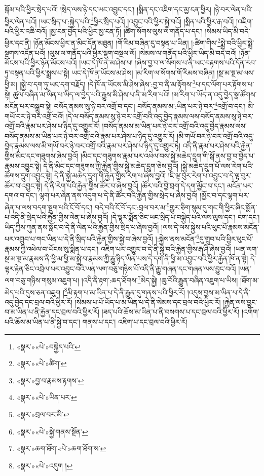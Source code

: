 སྐོམ་པའི་ཕྱིར་སྲེད་པའོ། །སྲེད་ལས་ཉེ་དང་ཡང་འབྱུང་དང་། །སྨིན་དང་འཇིག་དང་མྱ་ངན་ཕྱིར། །ཉེ་བར་ལེན་པའི་ཕྱིར་ལེན་པའོ། །ཡང་སྲིད་པ་:སྐྱེད་པའི་\footnote{«སྣར་»«པེ་»བསྐྱེད་པའི་}ཕྱིར་སྲིད་པའོ། །འབྱུང་བའི་ཕྱིར་སྐྱེ་བའོ། །སྨིན་པའི་ཕྱིར་རྒ་བའོ། །འཇིག་པའི་ཕྱིར་འཆི་བའོ། །མྱ་ངན་བྱེད་པའི་ཕྱིར་མྱ་ངན་ཏོ། །ཚིག་སོགས་ལུས་ལ་གནོད་པ་དང་། །སེམས་ཡིད་མི་བདེ་ཕྱིར་དང་ནི། །ཉོན་མོངས་ཕྱིར་ན་མིང་དོན་མཐུན། །གོ་རིམ་བཞིན་དུ་བསྟན་པ་ཡིན། །:ཚིག་གིས་\footnote{«སྣར་»«པེ་»ཚིག་}སྨྲེ་བའི་ཕྱིར་སྨྲེ་སྔགས་འདོན་པའོ། །ལུས་ལ་གནོད་པའི་ཕྱིར་སྡུག་བསྔལ་ལོ། །སེམས་ལ་གནོད་པའི་ཕྱིར་ཡིད་མི་བདེ་བའོ། །ཉོན་མོངས་པའི་ཕྱིར་ཉོན་མོངས་པའོ། །ཡང་དེ་ཁོ་ན་མ་ཤེས་པ། །ཞེས་བྱ་བ་ལ་སོགས་པ་ནི་ཡང་བརྟགས་པའི་དོན་རབ་ཏུ་བསྟན་པའི་ཕྱིར་སྨྲས་པ་སྟེ། ཡང་དེ་ཁོ་ན་ཡོངས་མ་ཤེས། །མ་རིག་ལ་སོགས་གོ་རིམས་བཞིན། །སྔ་མ་སྔ་མ་ལས་ཕྱི་མ། །སྐྱེ་བ་དག་ཏུ་ཡང་དག་བརྗོད། །དེ་ཁོ་ན་ཡོངས་མི་ཤེས་ཞེས་:བྱ་བ་ནི་མ་རྟོགས་\footnote{«སྣར་»བྱ་བ་རྣམས་རྟགས་}པ་དང་ལོག་པར་རྟོགས་པ་སྟེ། ཚུལ་བཞིན་མ་ཡིན་པ་ཡིད་ལ་བྱེད་པའི་རྒྱུས་མི་ཤེས་པ་ནི་མ་རིག་པའོ། །མ་རིག་པ་ཡོད་ན་འདུ་བྱེད་སྣ་ཚོགས་མངོན་པར་བསྒྲུབ་སྟེ། བསོད་ནམས་སུ་ཉེ་བར་འགྲོ་བ་དང་། བསོད་ནམས་མ་:ཡིན་པར་ཉེ་བར་\footnote{«སྣར་»«པེ་»ཡིན་པར་}འགྲོ་བ་དང་། མི་གཡོ་བར་ཉེ་བར་འགྲོ་བའོ། །དེ་ལ་བསོད་ནམས་སུ་ཉེ་བར་འགྲོ་བའི་འདུ་བྱེད་རྣམས་ལས་བསོད་ནམས་སུ་ཉེ་བར་འགྲོ་བའི་རྣམ་པར་ཤེས་པ་ཉིད་དུ་འགྱུར་རོ། །བསོད་ནམས་མ་ཡིན་པར་ཉེ་བར་འགྲོ་བའི་འདུ་བྱེད་རྣམས་ལས་བསོད་ནམས་མ་ཡིན་པར་ཉེ་བར་འགྲོ་བའི་རྣམ་པར་ཤེས་པ་ཉིད་དུ་འགྱུར་རོ། །མི་གཡོ་བར་ཉེ་བར་འགྲོ་བའི་འདུ་བྱེད་རྣམས་ལས་མི་གཡོ་བར་ཉེ་བར་འགྲོ་བའི་རྣམ་པར་ཤེས་པ་ཉིད་དུ་འགྱུར་ཏེ། འདི་ནི་རྣམ་པར་ཤེས་པའི་རྐྱེན་གྱིས་མིང་དང་གཟུགས་ཞེས་བྱའོ། །མིང་དང་གཟུགས་རྣམ་པར་འཕེལ་བས་སྐྱེ་མཆེད་དྲུག་གི་སྒོ་ནས་བྱ་བ་བྱེད་པ་རྣམས་འབྱུང་སྟེ། དེ་ནི་མིང་དང་གཟུགས་ཀྱི་རྐྱེན་གྱིས་སྐྱེ་མཆེད་དྲུག་ཅེས་བྱའོ། །སྐྱེ་མཆེད་དྲུག་པོ་ལས་རེག་པའི་ཚོགས་དྲུག་འབྱུང་སྟེ། དེ་ནི་སྐྱེ་མཆེད་དྲུག་གི་རྐྱེན་གྱིས་རེག་པ་ཞེས་བྱའོ། །ཇི་ལྟ་བུར་རེག་པ་འབྱུང་བ་དེ་ལྟ་བུར་ཚོར་བ་འབྱུང་སྟེ། དེ་ནི་རེག་པའི་རྐྱེན་གྱིས་ཚོར་བ་ཞེས་བྱའོ། །ཚོར་བའི་བྱེ་བྲག་དེ་དག་མྱོང་བ་དང་། མངོན་པར་དགའ་བ་དང་། ལྷག་པར་ཞེན་ནས་འདུག་པ་དེ་ནི་ཚོར་བའི་རྐྱེན་གྱིས་སྲེད་པ་ཞེས་བྱའོ། །མྱོང་བ་དང་ལྷག་པར་ཞེན་པ་ལས་བདག་སྡུག་པའི་ངོ་བོ་དང་། བདེ་བའི་ངོ་བོ་དང་:བྲལ་བར་མ་\footnote{«སྣར་»བྲལ་བར་མི་}གྱུར་ཅིག་སྙམ་དུ་གང་གི་ཕྱིར་ཞིང་སྨོན་པ་འདི་ནི་སྲེད་པའི་རྐྱེན་གྱིས་ལེན་པ་ཞེས་བྱའོ། །དེ་ལྟར་སྨོན་ཅིང་ཡང་སྲིད་པ་བསྐྱེད་པའི་ལས་ལུས་དང་། ངག་དང་། ཡིད་ཀྱིས་ཀུན་ནས་སློང་བ་དེ་ནི་ལེན་པའི་རྐྱེན་གྱིས་སྲིད་པ་ཞེས་བྱའོ། །ལས་དེ་ལས་སྐྱེས་པའི་ཕུང་པོ་རྣམས་མངོན་པར་འགྲུབ་པ་གང་ཡིན་པ་དེ་ནི་སྲིད་པའི་རྐྱེན་གྱིས་སྐྱེ་བ་ཞེས་བྱའོ། །:སྐྱེས་ནས་མངོན་\footnote{«སྣར་»«པེ་»སྐྱེ་གནས་སྔོན་}དུ་གྲུབ་པའི་ཕྱིར་ཕུང་པོ་རྣམས་ཀྱི་འཕེལ་བ་ཡོངས་སུ་སྨིན་པ་དང་། འཇིག་པར་འགྱུར་བ་དེ་ནི་སྐྱེ་བའི་རྐྱེན་གྱིས་རྒ་ཤི་ཞེས་བྱའོ། །ཡན་ལག་སྔ་མ་སྔ་མ་རྣམས་ནི་ཕྱི་མ་ཕྱི་མ་སྐྱེ་བ་རྣམས་ཀྱི་རྒྱུ་ཉིད་ཡིན་པས་དེ་དག་ནི་ཕྱི་མ་འབྱུང་བའི་ཕྱིར་རྐྱེན་ཁོ་ན་སྟེ། དེ་ལྟར་རྟེན་ཅིང་འབྲེལ་པར་འབྱུང་བའི་ཡན་ལག་བཅུ་གཉིས་པོ་འདི་ནི་རྒྱུ་གཞན་དང་གཞན་ལས་བྱུང་བའོ། །ཡན་ལག་བཅུ་གཉིས་གསུམ་འཇུག་པ། །འདི་ནི་རྟག་:ཆད་ཐོགས་\footnote{«སྣར་»ཆག་ཐོག་«པེ་»ཆག་ཐོག་ས་}མེད་སྐྱེ། །ཆུ་བོའི་རྒྱུན་བཞིན་འཇུག་པ་ཡིས། །ཐོག་མ་མེད་པའི་དུས་ཅན་འཇུག །\footnote{«སྣར་»«པེ་»འདུག །}མི་རྟག་པ་མ་ཡིན་པ་དེ་ནི་རྒྱུན་དུ་གནས་པའི་ཕྱིར་རོ། །འདུས་བྱས་མ་ཡིན་པ་དེ་ནི་འདུ་བྱེད་དང་བྲལ་བའི་ཕྱིར་རོ། །སེམས་པ་པོ་ཡོད་པ་མ་ཡིན་པ་དེ་ནི་སེམས་དང་བྲལ་བའི་ཕྱིར་རོ། །རྐྱེན་ལས་བྱུང་བ་མ་ཡིན་པ་ནི་རྐྱེན་དང་བྲལ་བའི་ཕྱིར་རོ། །ཟད་པའི་ཆོས་མ་ཡིན་པ་ནི་བསགས་པ་དང་བྲལ་བའི་ཕྱིར་རོ། །འགོག་པའི་ཆོས་མ་ཡིན་པ་ནི་སྐྱེ་བ་དང་། གནས་པ་དང་། འཇིག་པ་དང་བྲལ་བའི་ཕྱིར་རོ། 